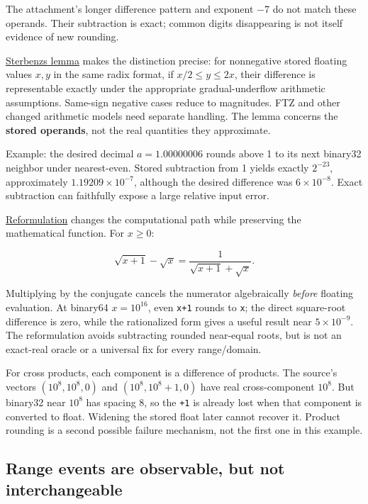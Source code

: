 The attachment's longer difference pattern and exponent −7 do not match these operands. Their subtraction is exact; common digits disappearing is not itself evidence of new rounding.

\hyperref[appendix-399b7ad53f39]{Sterbenz\textquotesingle s lemma} makes the distinction precise: for nonnegative stored floating values \(x,y\) in the same radix format, if \(x/2\le y\le2x\), their difference is representable exactly under the appropriate gradual-underflow arithmetic assumptions. Same-sign negative cases reduce to magnitudes. FTZ and other changed arithmetic models need separate handling. The lemma concerns the \textbf{stored operands}, not the real quantities they approximate.

Example: the desired decimal \(a=1.00000006\) rounds above 1 to its next binary32 neighbor under nearest-even. Stored subtraction from 1 yields exactly \(2^{-23}\), approximately \(1.19209\times10^{-7}\), although the desired difference was \(6\times10^{-8}\). Exact subtraction can faithfully expose a large relative input error.

\hyperref[appendix-d7f8ba961670]{Reformulation} changes the computational path while preserving the mathematical function. For \(x\ge0\):

\[
\sqrt{x+1}-\sqrt{x}
=\frac{1}{\sqrt{x+1}+\sqrt{x}}.
\]

Multiplying by the conjugate cancels the numerator algebraically \emph{before} floating evaluation. At binary64 \(x=10^{16}\), even \texttt{x+1} rounds to \texttt{x}; the direct square-root difference is zero, while the rationalized form gives a useful result near \(5\times10^{-9}\). The reformulation avoids subtracting rounded near-equal roots, but is not an exact-real oracle or a universal fix for every range/domain.

For cross products, each component is a difference of products. The source's vectors \((10^8,10^8,0)\) and \((10^8,10^8+1,0)\) have real cross-component \(10^8\). But binary32 near \(10^8\) has spacing 8, so the \texttt{+1} is already lost when that component is converted to float. Widening the stored float later cannot recover it. Product rounding is a second possible failure mechanism, not the first one in this example.

\subsection{Range events are observable, but not interchangeable}\label{01-foundations-i-ch001-range-events-are-observable-but-not-interchangeable}

